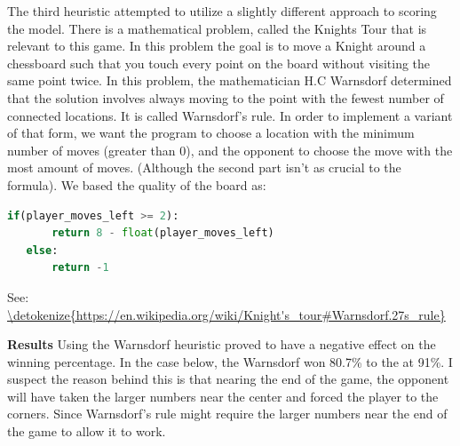\documentclass{article}
\begin{document}
The third heuristic attempted to utilize a slightly different approach to scoring the model. \newline
There is a mathematical problem, called the Knights Tour that is relevant to this game. In this problem the goal
is to move a Knight around a chessboard such that you touch every point on the board without visiting the same point twice.
In this problem, the mathematician H.C Warnsdorf determined that the solution involves always moving to the point with the fewest number of connected locations. It is called
 Warnsdorf's rule.\newline
 In order to implement a variant of that form, we want the program to choose a location with the minimum number of moves (greater than 0),
 and the opponent to choose the move with the most amount of moves. (Although the second part isn't as crucial to the formula). We based
 the quality of the board as:\newline

 \begin{lstlisting}[language = python]
   if(player_moves_left >= 2):
       return 8 - float(player_moves_left)
   else:
       return -1
 \end{lstlisting}

See: \url{\detokenize{https://en.wikipedia.org/wiki/Knight's_tour#Warnsdorf.27s_rule}}\newline


\textbf{Results}\newline
Using the Warnsdorf heuristic proved to have a negative effect on the winning percentage. In the case below,
the Warnsdorf won 80.7\% to the \texttt{} at 91\%. I suspect the reason behind this
is that nearing the end of the game, the opponent will have taken the larger numbers near the center and forced
the player to the corners. Since Warnsdorf's rule might require the larger numbers near the end of the game to
allow it to work.
\end{document}
